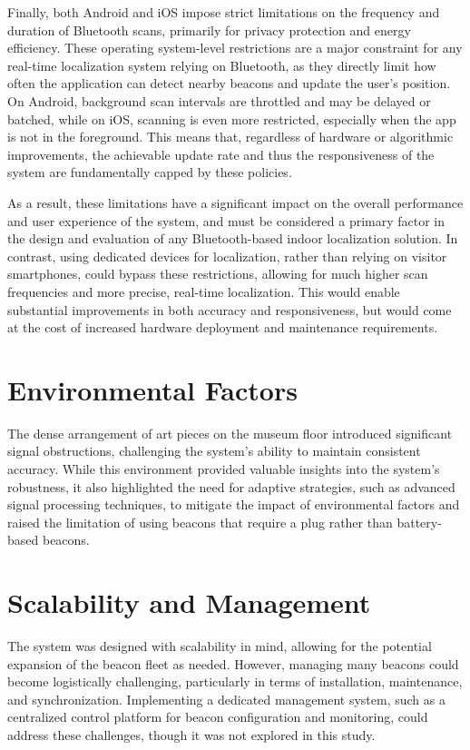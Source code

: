 Finally, both Android and iOS impose strict limitations on the frequency and duration of Bluetooth scans, primarily for privacy protection and energy efficiency. These operating system-level restrictions are a major constraint for any real-time localization system relying on Bluetooth, as they directly limit how often the application can detect nearby beacons and update the user's position. On Android, background scan intervals are throttled and may be delayed or batched, while on iOS, scanning is even more restricted, especially when the app is not in the foreground. This means that, regardless of hardware or algorithmic improvements, the achievable update rate and thus the responsiveness of the system are fundamentally capped by these policies.

As a result, these limitations have a significant impact on the overall performance and user experience of the system, and must be considered a primary factor in the design and evaluation of any Bluetooth-based indoor localization solution. In contrast, using dedicated devices for localization, rather than relying on visitor smartphones, could bypass these restrictions, allowing for much higher scan frequencies and more precise, real-time localization. This would enable substantial improvements in both accuracy and responsiveness, but would come at the cost of increased hardware deployment and maintenance requirements.

\section{Environmental Factors}
The dense arrangement of art pieces on the museum floor introduced significant signal obstructions, challenging the system’s ability to maintain consistent accuracy. While this environment provided valuable insights into the system’s robustness, it also highlighted the need for adaptive strategies, such as advanced signal processing techniques, to mitigate the impact of environmental factors and raised the limitation of using beacons that require a plug rather than battery-based beacons.

\section{Scalability and Management}
The system was designed with scalability in mind, allowing for the potential expansion of the beacon fleet as needed. However, managing many beacons could become logistically challenging, particularly in terms of installation, maintenance, and synchronization. Implementing a dedicated management system, such as a centralized control platform for beacon configuration and monitoring, could address these challenges, though it was not explored in this study.

